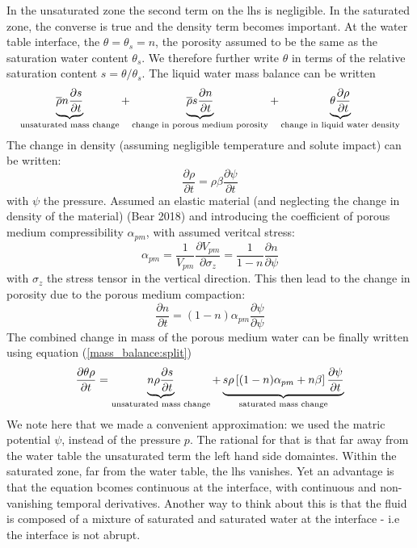 \documentclass{article}
\begin{document}
In the unsaturated zone the second term on the lhs is negligible. In the saturated zone, the converse is true and the density term becomes important. At the water table interface, the $\theta=\theta_s=n$, the porosity assumed to be the same as the saturation water content $\theta_{s}$. We therefore further write $\theta$ in terms of the relative saturation content $s=\theta/\theta_s$.
The liquid water mass balance can be written
\begin{equation}
\underbrace{{\overline \rho} n \frac{\partial s}{\partial t} }_\text{\rm unsaturated mass change} + \underbrace{{\overline \rho} s \frac{\partial n}{\partial t}  }_\text{\rm change in porous medium porosity}  
+ 
\underbrace{\theta \frac{\partial \rho}{\partial t}   }_\text{\rm change in liquid water density}  
\label{mass_balance:split}
\end{equation}
The change in density (assuming negligible temperature and solute impact) can be written:
\begin{equation}
\frac{\partial \rho}{\partial t} = \rho \beta \frac{\partial \psi}{\partial t}
\end{equation}
with $\psi$ the pressure.
Assumed an elastic material (and neglecting the change in density of the material) (Bear 2018) and introducing the coefficient of porous medium compressibility $\alpha_{pm}$, with assumed veritcal stress:
\begin{equation}
\alpha_{pm}=\frac{1}{V_{pm}} \frac{\partial V_{pm}}{\partial \sigma_z} = \frac{1}{1-n} \frac{\partial n}{\partial \psi}
\end{equation}
with $\sigma_z$ the stress tensor in the vertical direction.
This then lead to the change in porosity due to the porous medium compaction:
\begin{equation}
\frac{\partial n}{\partial t} = (1-n)\alpha_{pm}\frac{\partial \psi}{ \partial \psi}
\end{equation}
The combined change in mass of the porous medium water can be finally written using equation (\ref{mass_balance:split}) 
\begin{equation}
\frac{\partial \theta \rho}{\partial t} = 
\underbrace{n \rho \frac{\partial s}{ \partial t} }_\text{\rm unsaturated mass change} + \underbrace{s \rho \left[  (1-n)\alpha_{pm} + n\beta \right] \frac{\partial \psi}{\partial t} }_\text{\rm saturated mass change}
\end{equation}
We note here that we made a convenient approximation: we used the matric potential $\psi$, instead of the pressure $p$. The rational for that is that far away from the water table the unsaturated term the left hand side domaintes. Within the saturated zone, far from the water table, the lhs vanishes. Yet an advantage is that the equation bcomes continuous at the interface, with continuous and non-vanishing temporal derivatives. Another way to think about this is that the fluid is composed of a mixture of saturated and saturated water at the interface - i.e the interface is not abrupt. 
\end{document}
